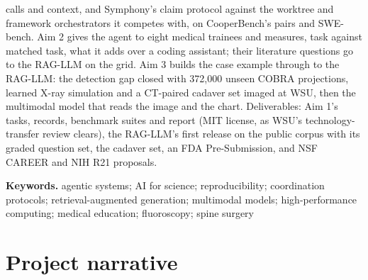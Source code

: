 \documentclass[10pt,letterpaper]{article}
\begin{document}
{calls and context, and Symphony's claim protocol against the worktree and framework orchestrators it competes with, on CooperBench's pairs and SWE-bench. Aim 2 gives the agent to eight medical trainees and measures, task
against matched task, what it adds over a coding assistant; their literature questions go to the RAG-LLM on the grid. Aim 3 builds the case example through to the RAG-LLM: the detection gap closed with 372,000 unseen COBRA projections, learned X-ray simulation and a CT-paired cadaver set imaged at WSU, then the multimodal
model that reads the image and the chart. Deliverables: Aim 1's tasks, records, benchmark suites and report (MIT
license, as WSU's technology-transfer review clears), the RAG-LLM's first release on the public corpus with its graded
question set, the cadaver set, an FDA Pre-Submission, and NSF CAREER and NIH R21 proposals.

\vspace{2pt}
{\bfseries Keywords.} agentic systems; AI for science; reproducibility; coordination protocols; retrieval-augmented
generation; multimodal models; high-performance computing; medical education; fluoroscopy; spine surgery}

\clearpage
\begingroup\fontsize{8.8}{9.7}\selectfont\setlength{\parskip}{0.5pt}\setlength{\textfloatsep}{4pt}
\section*{Project narrative}
\end{document}
